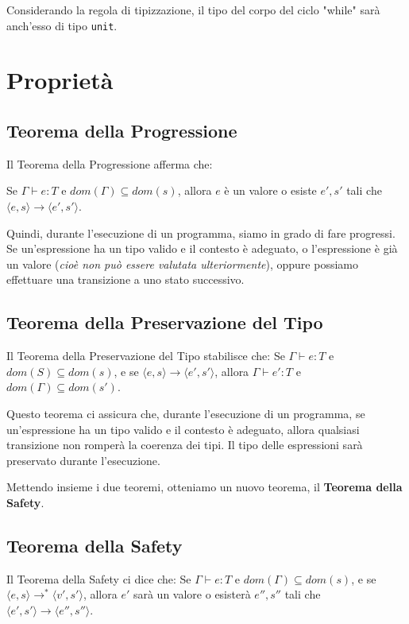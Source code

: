 Considerando la regola di tipizzazione, il tipo del corpo del ciclo "while" sarà anch'esso di tipo \texttt{unit}.
\section{Proprietà}

\subsection{Teorema della Progressione}

Il Teorema della Progressione afferma che: 
\begin{tcolorbox}
Se $\Gamma \vdash e : T$ e $dom(\Gamma) \subseteq dom(s)$, allora $e$ è un
valore o esiste $e', s'$ tali che $\langle e, s \rangle \rightarrow \langle e', s' \rangle$.
\end{tcolorbox}
Quindi, durante l'esecuzione di
un programma, siamo in grado di fare progressi. Se un'espressione ha un tipo
valido e il contesto è adeguato, o l'espressione è già un valore (\textit{cioè non può essere valutata ulteriormente}),
oppure possiamo effettuare una transizione a uno stato successivo.

\subsection{Teorema della Preservazione del Tipo}
\begin{tcolorbox}
Il Teorema della Preservazione del Tipo stabilisce che:
Se $\Gamma \vdash e : T$ e $dom(S) \subseteq dom(s)$,
e se $\langle e, s \rangle \rightarrow \langle e', s' \rangle$, allora $\Gamma \vdash e' : T$ e $dom( \Gamma)
\subseteq dom(s')$.
\end{tcolorbox}
Questo teorema ci assicura che, durante l'esecuzione di un programma, se un'espressione ha un tipo
valido e il contesto è adeguato, allora qualsiasi transizione non romperà la coerenza dei tipi. Il tipo
delle espressioni sarà preservato durante l'esecuzione.

Mettendo insieme i due teoremi, otteniamo un nuovo teorema, il \textbf{Teorema della Safety}.

\subsection{Teorema della Safety}
\begin{tcolorbox}
  Il Teorema della Safety ci dice che: 
Se $\Gamma \vdash e : T$ e $dom(\Gamma) \subseteq dom(s)$, e se $\langle e,
s \rangle \rightarrow^* \langle v', s' \rangle$, allora $e'$ sarà un valore o esisterà $e'', s''$ tali che
$\langle e', s' \rangle \rightarrow \langle e'', s'' \rangle$. 
\end{tcolorbox}



